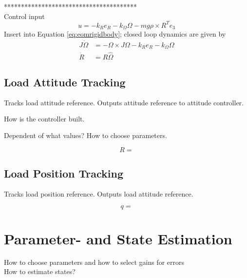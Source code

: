 ***************************************\\

Control input \cite{Lee2011}
\begin{equation}\label{eq:inputattitude}
u=-k_Re_R-k_\Omega\Omega-mg\rho\times R^Te_3
\end{equation}
Insert into Equation \ref{eq:eomrigidbody}; closed loop dynamics are given by
\begin{align}\label{eq:CLdynamics}
J\dot{\Omega} &= -\Omega\times J\Omega-k_Re_R-k_\Omega\Omega \\
\dot{R} &= R\hat{\Omega}
\end{align}

\subsection{Load Attitude Tracking}

Tracks load attitude reference. Outputs attitude reference to attitude controller.
	
How is the controller built.

Dependent of what values? 	How to choose parameters.

\begin{equation}\label{key}
R = 
\end{equation}

\subsection{Load Position Tracking}

Tracks load position reference. Outputs load attitude reference.

\begin{equation}\label{key}
q =
\end{equation}

\section{Parameter- and State Estimation}

How to choose parameters and how to select gains for errors\\

How to estimate states?



